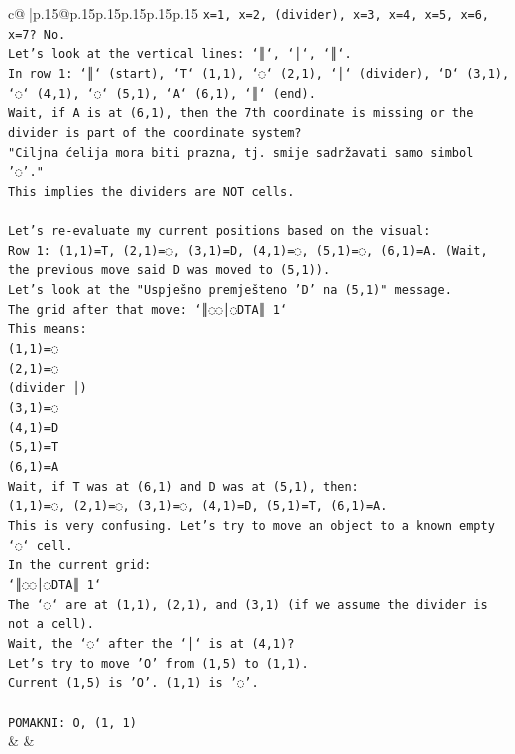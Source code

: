 \documentclass{article}
\begin{document}
{\begin{supertabular}{c@{$\;$}|p{.15\linewidth}@{}p{.15\linewidth}p{.15\linewidth}p{.15\linewidth}p{.15\linewidth}p{.15\linewidth}}
{{{\texttt{x=1, x=2, (divider), x=3, x=4, x=5, x=6, x=7? No.} \\
\texttt{Let's look at the vertical lines: `║`, `│`, `║`.} \\
\texttt{In row 1: `║` (start), `T` (1,1), `◌` (2,1), `│` (divider), `D` (3,1), `◌` (4,1), `◌` (5,1), `A` (6,1), `║` (end).} \\
\texttt{Wait, if A is at (6,1), then the 7th coordinate is missing or the divider is part of the coordinate system?} \\
\texttt{"Ciljna ćelija mora biti prazna, tj. smije sadržavati samo simbol '◌'."} \\
\texttt{This implies the dividers are NOT cells.} \\
\\ 
\texttt{Let's re{-}evaluate my current positions based on the visual:} \\
\texttt{Row 1: (1,1)=T, (2,1)=◌, (3,1)=D, (4,1)=◌, (5,1)=◌, (6,1)=A. (Wait, the previous move said D was moved to (5,1)).} \\
\texttt{Let's look at the "Uspješno premješteno 'D' na (5,1)" message.} \\
\texttt{The grid after that move: `║◌◌│◌DTA║ 1`} \\
\texttt{This means:} \\
\texttt{(1,1)=◌} \\
\texttt{(2,1)=◌} \\
\texttt{(divider │)} \\
\texttt{(3,1)=◌} \\
\texttt{(4,1)=D} \\
\texttt{(5,1)=T} \\
\texttt{(6,1)=A} \\
\texttt{Wait, if T was at (6,1) and D was at (5,1), then:} \\
\texttt{(1,1)=◌, (2,1)=◌, (3,1)=◌, (4,1)=D, (5,1)=T, (6,1)=A.} \\
\texttt{This is very confusing. Let's try to move an object to a known empty `◌` cell.} \\
\texttt{In the current grid:} \\
\texttt{`║◌◌│◌DTA║ 1`} \\
\texttt{The `◌` are at (1,1), (2,1), and (3,1) (if we assume the divider is not a cell).} \\
\texttt{Wait, the `◌` after the `│` is at (4,1)?} \\
\texttt{Let's try to move 'O' from (1,5) to (1,1).} \\
\texttt{Current (1,5) is 'O'. (1,1) is '◌'.} \\
\\ 
\texttt{POMAKNI: O, (1, 1)} \\
            }
        }
    }
    & & \\ \\


\end{supertabular}}
\end{document}
